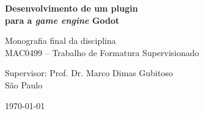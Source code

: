 \newpage
\thispagestyle{empty}
  \begin{center}
    \vspace*{2.3 cm}
    \textbf{\Large{Desenvolvimento de um plugin\\
    para a \textit{game engine} Godot}}
    \vspace*{2 cm}
  \end{center}

  \vskip 2cm

  \begin{flushright}
    Monografia final da disciplina\\
    MAC0499 -- Trabalho de Formatura Supervisionado
  \end{flushright}

  \vskip 5cm

  \begin{center}
  Supervisor: Prof. Dr. Marco Dimas Gubitoso\\

  \vskip 5cm
  \normalsize{São Paulo}

  \today
  \end{center}
\pagebreak

